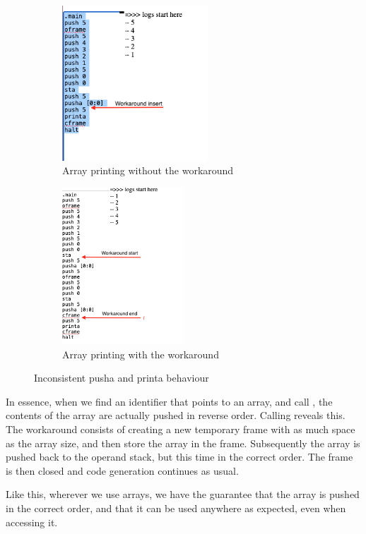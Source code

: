 \begin{figure}[H]
    \centering
    \begin{subfigure}{.5\textwidth}
        \centering
        \includegraphics[width=0.6\textwidth]{figures/no_wk.png}
        \caption{Array printing without the workaround}
        \label{fig:no_wk}
    \end{subfigure}%
    \begin{subfigure}{.5\textwidth}
        \centering
        \includegraphics[width=0.5\textwidth]{figures/image.png}
        \caption{Array printing with the workaround}
        \label{fig:array_print}
    \end{subfigure}
    \caption{Inconsistent pusha and printa behaviour}
    \label{fig:array_instructions}
\end{figure}


In essence, when we find an identifier that points to an array, and call
, the contents of the array are actually pushed in reverse
order. Calling  reveals this. The workaround consists of
creating a new temporary frame with as much space as the array size, and then
store the array in the frame. Subsequently the array is pushed back to the
operand stack, but this time in the correct order. The frame is then closed and
code generation continues as usual.

Like this, wherever we use arrays, we have the guarantee that the array is
pushed in the correct order, and that it can be used anywhere as expected, even
when accessing it.
